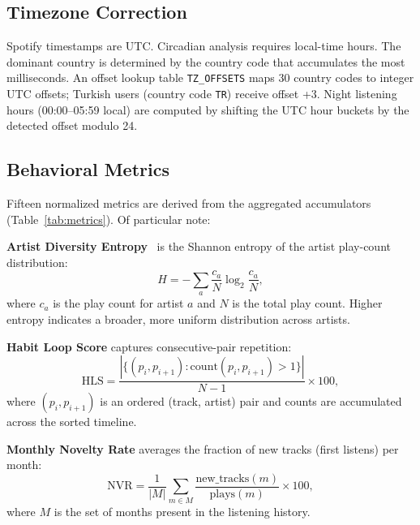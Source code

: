 \documentclass[conference]{IEEEtran}
\begin{document}
\subsection{Timezone Correction}

Spotify timestamps are UTC. Circadian analysis requires local-time hours.
The dominant country is determined by the country code that accumulates the
most milliseconds. An offset lookup table \texttt{TZ\_OFFSETS} maps 30
country codes to integer UTC offsets; Turkish users (country code
\texttt{TR}) receive offset +3. Night listening hours (00:00–05:59 local)
are computed by shifting the UTC hour buckets by the detected offset modulo
24.

\subsection{Behavioral Metrics}

Fifteen normalized metrics are derived from the aggregated accumulators
(Table~\ref{tab:metrics}). Of particular note:

\textbf{Artist Diversity Entropy}~\cite{shannon1948mathematical} is the Shannon entropy of the artist
play-count distribution:
\begin{equation}
  H = -\sum_{a} \frac{c_a}{N} \log_2 \frac{c_a}{N},
\end{equation}
where $c_a$ is the play count for artist $a$ and $N$ is the total play count.
Higher entropy indicates a broader, more uniform distribution across artists.

\textbf{Habit Loop Score} captures consecutive-pair repetition:
\begin{equation}
  \text{HLS} = \frac{|\{(p_i, p_{i+1}) : \mathrm{count}(p_i, p_{i+1}) > 1\}|}{N - 1} \times 100,
\end{equation}
where $(p_i, p_{i+1})$ is an ordered (track, artist) pair and counts are
accumulated across the sorted timeline.

\textbf{Monthly Novelty Rate} averages the fraction of new tracks (first
listens) per month:
\begin{equation}
  \text{NVR} = \frac{1}{|M|} \sum_{m \in M} \frac{\text{new\_tracks}(m)}{\text{plays}(m)} \times 100,
\end{equation}
where $M$ is the set of months present in the listening history.
\end{document}
